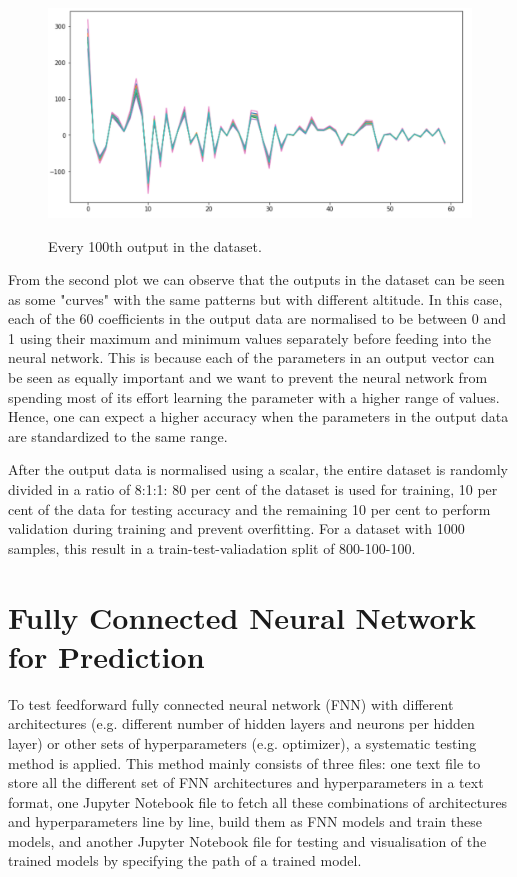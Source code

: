 \begin{figure}[H]
    \caption{Every 100th output in the dataset.}
    \includegraphics[scale=0.6]{figures/geoid_images/Geoid_sample_output.png}
    \label{figure:geoid_output}
\end{figure}

From the second plot we can observe that the outputs in the dataset can be seen as some "curves" with the same patterns but with different altitude. In this case, each of the 60 coefficients in the output data are normalised to be between 0 and 1 using their maximum and minimum values separately before feeding into the neural network. This is because each of the parameters in an output vector can be seen as equally important and we want to prevent the neural network from spending most of its effort learning the parameter with a higher range of values. Hence, one can expect a higher accuracy when the parameters in the output data are standardized to the same range.

After the output data is normalised using a scalar, the entire dataset is randomly divided in a ratio of 8:1:1: 80 per cent of the dataset is used for training, 10 per cent of the data for testing accuracy and the remaining 10 per cent to perform validation during training and prevent overfitting. For a dataset with 1000 samples, this result in a train-test-valiadation split of 800-100-100.


\section{Fully Connected Neural Network for Prediction}

To test feedforward fully connected neural network (FNN) with different architectures (e.g. different number of hidden layers and neurons per hidden layer) or other sets of hyperparameters (e.g. optimizer), a systematic testing method is applied. This method mainly consists of three files: one text file to store all the different set of FNN architectures and hyperparameters in a text format, one Jupyter Notebook file to fetch all these combinations of architectures and hyperparameters line by line, build them as FNN models and train these models, and another Jupyter Notebook file for testing and visualisation of the trained models by specifying the path of a trained model.

